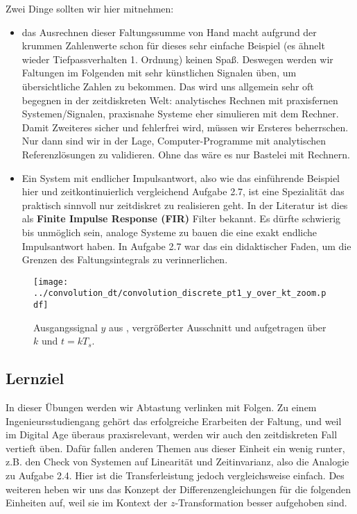 Zwei Dinge sollten wir hier mitnehmen:
\begin{itemize}
\item das Ausrechnen dieser Faltungssumme von Hand macht aufgrund der krummen Zahlenwerte
schon für dieses sehr einfache Beispiel (es ähnelt wieder Tiefpassverhalten 1. Ordnung)
keinen Spaß.
Deswegen werden wir Faltungen im Folgenden mit sehr künstlichen Signalen
üben, um übersichtliche Zahlen zu bekommen. Das wird uns allgemein
sehr oft begegnen in der zeitdiskreten Welt:
analytisches Rechnen mit praxisfernen Systemen/Signalen,
praxisnahe Systeme eher simulieren mit dem Rechner. Damit Zweiteres sicher
und fehlerfrei wird, müssen wir Ersteres beherrschen. Nur dann sind wir in der
Lage, Computer-Programme mit analytischen Referenzlösungen zu validieren.
Ohne das wäre es nur Bastelei mit Rechnern.
\item Ein System mit endlicher Impulsantwort, also wie das einführende Beispiel
hier und zeitkontinuierlich vergleichend Aufgabe 2.7, ist eine Spezialität das
praktisch sinnvoll nur zeitdiskret zu realisieren geht. In der Literatur
ist dies als \textbf{Finite Impulse Response (FIR)} Filter bekannt.
Es dürfte schwierig bis unmöglich sein, analoge Systeme zu bauen die eine
exakt endliche Impulsantwort haben. In Aufgabe 2.7 war das ein didaktischer
Faden, um die Grenzen des Faltungsintegrals zu verinnerlichen.
\end{itemize}
%
\begin{figure}[t]
\centering
\texttt{[image: ../convolution\_dt/convolution\_discrete\_pt1\_y\_over\_kt\_zoom.pdf]}
\caption{Ausgangssignal $y$ aus ,
vergrößerter Ausschnitt und aufgetragen über $k$ und $t=k T_s$.}
\label{fig:convolution_discrete_pt1_y_over_kt_zoom}
\end{figure}

\subsection*{Lernziel}
In dieser Übungen werden wir Abtastung verlinken mit Folgen.
Zu einem Ingenieursstudiengang gehört das erfolgreiche Erarbeiten
der Faltung, und weil im Digital Age überaus praxisrelevant,
werden wir auch den zeitdiskreten Fall vertieft üben.
Dafür fallen anderen Themen aus dieser Einheit ein wenig runter, z.B.
den Check von Systemen auf Linearität und Zeitinvarianz, also die Analogie zu
Aufgabe 2.4. Hier ist die Transferleistung jedoch vergleichsweise einfach.
Des weiteren heben wir uns das Konzept der Differenzengleichungen für die folgenden
Einheiten auf, weil sie im Kontext der $z$-Transformation besser aufgehoben sind.


